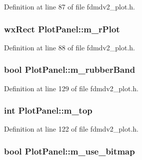 Definition at line 87 of file fdmdv2\-\_\-plot.\-h.

\hypertarget{class_plot_panel_aa4d6249f2f09d03682b8fa704be04548}{
\subsubsection[{m\-\_\-r\-Plot}]{\setlength{\rightskip}{0pt plus 5cm}wx\-Rect Plot\-Panel\-::m\-\_\-r\-Plot}}\label{class_plot_panel_aa4d6249f2f09d03682b8fa704be04548}


Definition at line 88 of file fdmdv2\-\_\-plot.\-h.

\hypertarget{class_plot_panel_a7182715e509f98f42e78210d324fe042}{
\subsubsection[{m\-\_\-rubber\-Band}]{\setlength{\rightskip}{0pt plus 5cm}bool Plot\-Panel\-::m\-\_\-rubber\-Band\hspace{0.3cm}{\ttfamily [protected]}}}\label{class_plot_panel_a7182715e509f98f42e78210d324fe042}


Definition at line 129 of file fdmdv2\-\_\-plot.\-h.

\hypertarget{class_plot_panel_a8c49969c560b64902272347835f151a0}{
\subsubsection[{m\-\_\-top}]{\setlength{\rightskip}{0pt plus 5cm}int Plot\-Panel\-::m\-\_\-top\hspace{0.3cm}{\ttfamily [protected]}}}\label{class_plot_panel_a8c49969c560b64902272347835f151a0}


Definition at line 122 of file fdmdv2\-\_\-plot.\-h.

\hypertarget{class_plot_panel_a20336cef42ecb91f0fd1f9af1f70ba43}{
\subsubsection[{m\-\_\-use\-\_\-bitmap}]{\setlength{\rightskip}{0pt plus 5cm}bool Plot\-Panel\-::m\-\_\-use\-\_\-bitmap\hspace{0.3cm}{\ttfamily [protected]}}}\label{class_plot_panel_a20336cef42ecb91f0fd1f9af1f70ba43}


